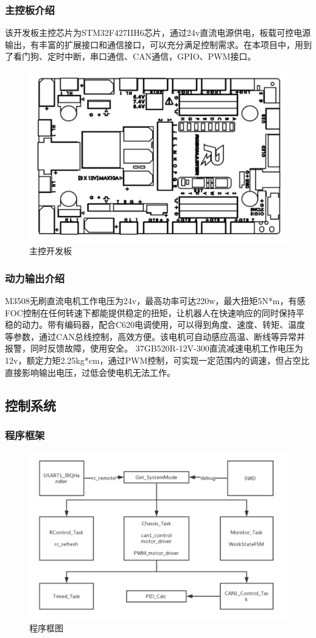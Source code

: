 \documentclass[a4paper, 11pt]{article}   %
\begin{document}
\begin{CJK}{UTF8}{gbsn}
\begin{spacing}{1.15}
\subsubsection{主控板介绍}
该开发板主控芯片为STM32F427IIH6芯片，通过24v直流电源供电，板载可控电源输出，有丰富的扩展接口和通信接口，可以充分满足控制需求。在本项目中，用到了看门狗、定时中断，串口通信、CAN通信，GPIO、PWM接口。
 \begin{figure}[H]
\centering
\includegraphics[width=.8\textwidth]{chap5//fig5.jpg}
\caption{主控开发板}
\end{figure}
\subsubsection{动力输出介绍}
M3508无刷直流电机工作电压为24v，最高功率可达220w，最大扭矩5N*m，有感FOC控制在任何转速下都能提供稳定的扭矩，让机器人在快速响应的同时保持平稳的动力。带有编码器，配合C620电调使用，可以得到角度、速度、转矩、温度等参数，通过CAN总线控制，高效方便。该电机可自动感应高温、断线等异常并报警，同时反馈故障，使用安全。
37GB520R-12V-300直流减速电机工作电压为12v，额定力矩2.25kg*cm，通过PWM控制，可实现一定范围内的调速，但占空比直接影响输出电压，过低会使电机无法工作。
\subsection{控制系统}
\subsubsection{程序框架}
 \begin{figure}[H]
\centering
\includegraphics[width=.8\textwidth]{chap5//fig6.jpg}
\caption{程序框图}
\end{figure}

\end{spacing}
\end{CJK}
\end{document}
